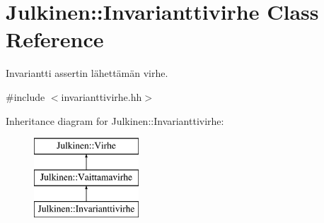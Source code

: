\hypertarget{class_julkinen_1_1_invarianttivirhe}{}\section{Julkinen\+:\+:Invarianttivirhe Class Reference}
\label{class_julkinen_1_1_invarianttivirhe}


Invariantti assertin lähettämän virhe.  




{\ttfamily \#include $<$invarianttivirhe.\+hh$>$}

Inheritance diagram for Julkinen\+:\+:Invarianttivirhe\+:\begin{figure}[H]
\begin{center}
\leavevmode
\includegraphics[height=3.000000cm]{class_julkinen_1_1_invarianttivirhe}
\end{center}
\end{figure}

